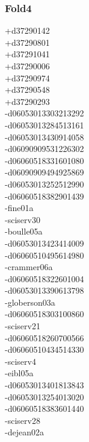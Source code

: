 \begin{multicols}{3}
\subsubsection*{Fold4}
+d37290142\\
+d37290801\\
+d37291041\\
+d37290006\\
+d37290974\\
+d37290548\\
+d37290293\\
-d06053013303213292\\
-d06053013284513161\\
-d06053013430914058\\
-d06090909531226302\\
-d06060518331601080\\
-d06090909494925869\\
-d06053013252512990\\
-d06060518382901439\\
-fine01a\\
-sciserv30\\
-boulle05a\\
-d06053013423414009\\
-d06060510495614980\\
-crammer06a\\
-d06060518322601004\\
-d06053013390613798\\
-globerson03a\\
-d06060518303100860\\
-sciserv21\\
-d06060518260700566\\
-d06060510434514330\\
-sciserv4\\
-eibl05a\\
-d06053013401813843\\
-d06053013254013020\\
-d06060518383601440\\
-sciserv28\\
-dejean02a\\

\end{multicols}
